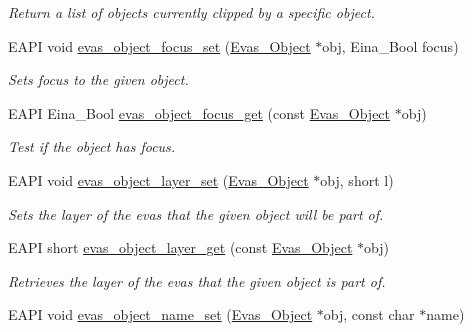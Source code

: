 \begin{DoxyCompactItemize}
\begin{DoxyCompactList}\small\item\em Return a list of objects currently clipped by a specific object. \item\end{DoxyCompactList}\item 
EAPI void \hyperlink{group__Evas__Object__Group__Basic_ga5f1530901a9e94e3f35b987101009cf5}{evas\_\-object\_\-focus\_\-set} (\hyperlink{group__Evas__Object__Group_ga9e19e6dd1f517a0ba437c0114d3e7c97}{Evas\_\-Object} $\ast$obj, Eina\_\-Bool focus)
\begin{DoxyCompactList}\small\item\em Sets focus to the given object. \item\end{DoxyCompactList}\item 
EAPI Eina\_\-Bool \hyperlink{group__Evas__Object__Group__Basic_ga7dc71b30e4caaaf60076a5990173d654}{evas\_\-object\_\-focus\_\-get} (const \hyperlink{group__Evas__Object__Group_ga9e19e6dd1f517a0ba437c0114d3e7c97}{Evas\_\-Object} $\ast$obj)
\begin{DoxyCompactList}\small\item\em Test if the object has focus. \item\end{DoxyCompactList}\item 
EAPI void \hyperlink{group__Evas__Object__Group__Basic_gab48bd3ad20b6663aa5756823edb02038}{evas\_\-object\_\-layer\_\-set} (\hyperlink{group__Evas__Object__Group_ga9e19e6dd1f517a0ba437c0114d3e7c97}{Evas\_\-Object} $\ast$obj, short l)
\begin{DoxyCompactList}\small\item\em Sets the layer of the evas that the given object will be part of. \item\end{DoxyCompactList}\item 
EAPI short \hyperlink{group__Evas__Object__Group__Basic_ga13cb52d23911b6c701dbb5f1ee3f65f4}{evas\_\-object\_\-layer\_\-get} (const \hyperlink{group__Evas__Object__Group_ga9e19e6dd1f517a0ba437c0114d3e7c97}{Evas\_\-Object} $\ast$obj)
\begin{DoxyCompactList}\small\item\em Retrieves the layer of the evas that the given object is part of. \item\end{DoxyCompactList}\item 
EAPI void \hyperlink{group__Evas__Object__Group__Basic_ga4b6eee1edde61389b5ca9df911de60d8}{evas\_\-object\_\-name\_\-set} (\hyperlink{group__Evas__Object__Group_ga9e19e6dd1f517a0ba437c0114d3e7c97}{Evas\_\-Object} $\ast$obj, const char $\ast$name)

\end{DoxyCompactItemize}
